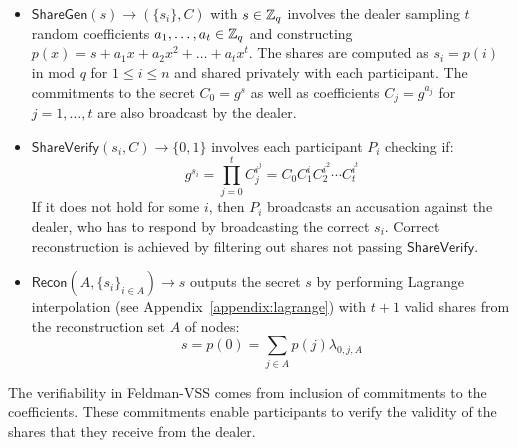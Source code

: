 \begin{itemize}
\item $\mathsf{ShareGen}(s) \rightarrow (\{s_i\}, C)$ with $s \in \mathbb{Z}_q$ involves the dealer sampling $t$ random coefficients $a_1, \ldots, a_t \in \mathbb{Z}_q$ and constructing $p(x) = s + a_1x+ a_2x^2 +\ldots+a_tx^t$. The shares are computed as $s_i = p(i)$ in mod $q$ for $1\le i \le n$ and shared privately with each participant. The commitments to the secret $C_0 = g^s$ as well as coefficients $C_j = g^{a_j}$ for $j = 1,\ldots,t$ are also broadcast by the dealer.
\item $\mathsf{ShareVerify}(s_i, C) \rightarrow \{0, 1\}$ involves each participant $P_i$ checking if:
$$g^{s_i} = \prod_{j = 0}^{t} C_j^{i^j} = C_0 C_1^i C_2^{i^2} \cdots C_{t}^{i^{t}}$$
If it does not hold for some $i$, then $P_i$ broadcasts an accusation against the dealer, who has to respond by broadcasting the correct $s_i$. Correct reconstruction is achieved by filtering out shares not passing $\mathsf{ShareVerify}$.
\item $\mathsf{Recon}(A, \{s_i\}_{i \in A}) \rightarrow s$ outputs the secret $s$ by performing Lagrange interpolation (see Appendix~\ref{appendix:lagrange}) with $t + 1$ valid shares from the reconstruction set $A$ of nodes:
$$s = p(0) = \sum_{j \in A} p(j) \lambda_{0, j, A}$$
\end{itemize}

The verifiability in Feldman-VSS comes from inclusion of commitments to the coefficients. These commitments enable participants to verify the validity of the shares that they receive from the dealer.



